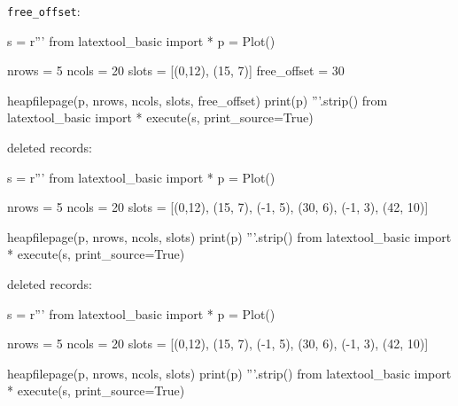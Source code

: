 \newpage
\verb!free_offset!:
\begin{python}
s = r'''
from latextool_basic import *
p = Plot()

nrows = 5
ncols = 20
slots = [(0,12), (15, 7)]
free_offset = 30

heapfilepage(p, nrows, ncols, slots, free_offset)
print(p)
'''.strip()
from latextool_basic import *
execute(s, print_source=True)
\end{python}


\newpage
deleted records:
\begin{python}
s = r'''
from latextool_basic import *
p = Plot()

nrows = 5
ncols = 20
slots = [(0,12), (15, 7), (-1, 5), (30, 6), (-1, 3), (42, 10)]

heapfilepage(p, nrows, ncols, slots)
print(p)
'''.strip()
from latextool_basic import *
execute(s, print_source=True)
\end{python}



\newpage
deleted records:
\begin{python}
s = r'''
from latextool_basic import *
p = Plot()

nrows = 5
ncols = 20
slots = [(0,12), (15, 7), (-1, 5), (30, 6), (-1, 3), (42, 10)]

heapfilepage(p, nrows, ncols, slots)
print(p)
'''.strip()
from latextool_basic import *
execute(s, print_source=True)
\end{python}
